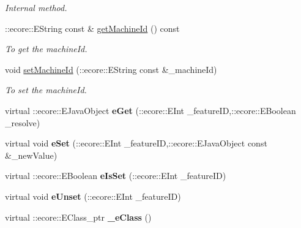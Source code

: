 \begin{DoxyCompactItemize}
\begin{DoxyCompactList}\small\item\em Internal method. \item\end{DoxyCompactList}\item 
::ecore::EString const \& \hyperlink{classIMS__Data_1_1ProcessOp_ae91f4794a9bf3d782d6fd3390d686a05}{getMachineId} () const 
\begin{DoxyCompactList}\small\item\em To get the machineId. \item\end{DoxyCompactList}\item 
void \hyperlink{classIMS__Data_1_1ProcessOp_abeee75625c3dd1a40b8bc018f40f8375}{setMachineId} (::ecore::EString const \&\_\-machineId)
\begin{DoxyCompactList}\small\item\em To set the machineId. \item\end{DoxyCompactList}\item 
\hypertarget{classIMS__Data_1_1ProcessOp_afc981e645f5795a443165018aca0af47}{
virtual ::ecore::EJavaObject {\bfseries eGet} (::ecore::EInt \_\-featureID,::ecore::EBoolean \_\-resolve)}
\label{classIMS__Data_1_1ProcessOp_afc981e645f5795a443165018aca0af47}

\item 
\hypertarget{classIMS__Data_1_1ProcessOp_a0099b12754e80a2d36b9be77763ddc5d}{
virtual void {\bfseries eSet} (::ecore::EInt \_\-featureID,::ecore::EJavaObject const \&\_\-newValue)}
\label{classIMS__Data_1_1ProcessOp_a0099b12754e80a2d36b9be77763ddc5d}

\item 
\hypertarget{classIMS__Data_1_1ProcessOp_a3d19385634b374b4abd9e49fc1de6a93}{
virtual ::ecore::EBoolean {\bfseries eIsSet} (::ecore::EInt \_\-featureID)}
\label{classIMS__Data_1_1ProcessOp_a3d19385634b374b4abd9e49fc1de6a93}

\item 
\hypertarget{classIMS__Data_1_1ProcessOp_aa6703d25bc4443e9a79ea10762aba39c}{
virtual void {\bfseries eUnset} (::ecore::EInt \_\-featureID)}
\label{classIMS__Data_1_1ProcessOp_aa6703d25bc4443e9a79ea10762aba39c}

\item 
\hypertarget{classIMS__Data_1_1ProcessOp_ace0a1cde840277b3b54e4cd470e5fc24}{
virtual ::ecore::EClass\_\-ptr {\bfseries \_\-eClass} ()}
\label{classIMS__Data_1_1ProcessOp_ace0a1cde840277b3b54e4cd470e5fc24}

\end{DoxyCompactItemize}
